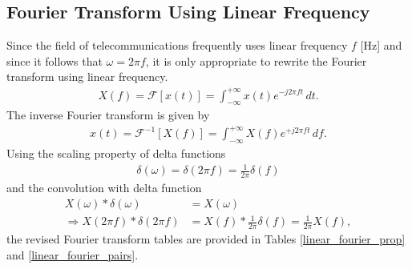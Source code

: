 \documentclass{report}
\begin{document}
\subsection{Fourier Transform Using Linear Frequency}
Since the field of telecommunications frequently uses linear frequency $f$ [Hz] and since it follows that $\omega=2\pi f$, it is only appropriate to rewrite the Fourier transform using linear frequency.
\begin{align}
    X(f) = \mathcal{F}[x(t)] = \int_{-\infty}^{+\infty} x(t) e^{-j2\pi ft} \,dt.
\end{align}
The inverse Fourier transform is given by
\begin{align}
    x(t) = \mathcal{F}^{-1}[X(f)] = \int_{-\infty}^{+\infty} X(f) e^{+j2\pi ft} \,df.
\end{align}
Using the scaling property of delta functions
\begin{align}
    \delta(\omega) = \delta(2\pi f) = \frac{1}{2\pi}\delta(f)
\end{align}
and the convolution with delta function
\begin{align}
    X(\omega) * \delta(\omega) &= X(\omega) \\
    \Longrightarrow X(2\pi f) * \delta(2\pi f) &= X(f) * \frac{1}{2\pi} \delta(f) = \frac{1}{2\pi} X(f),
\end{align}
the revised Fourier transform tables are provided in Tables \ref{linear_fourier_prop} and \ref{linear_fourier_pairs}.
\\ \\
\end{document}
